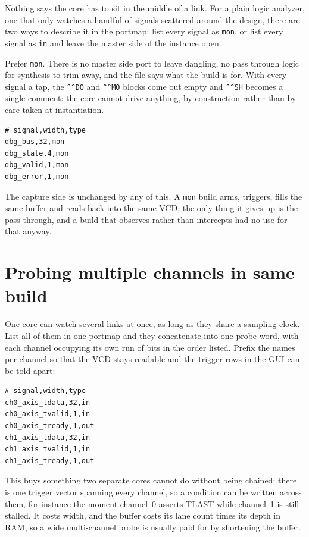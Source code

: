\documentclass[../manual.tex]{subfiles}
\begin{document}
Nothing says the core has to sit in the middle of a link. For a plain logic analyzer, one that only watches a handful of signals scattered around the design, there are two ways to describe it in the portmap: list every signal as \texttt{mon}, or list every signal as \texttt{in} and leave the master side of the instance open.

Prefer \texttt{mon}. There is no master side port to leave dangling, no pass through logic for synthesis to trim away, and the file says what the build is for. With every signal a tap, the \texttt{\^{}\^{}DO} and \texttt{\^{}\^{}MO} blocks come out empty and \texttt{\^{}\^{}SH} becomes a single comment: the core cannot drive anything, by construction rather than by care taken at instantiation.

\begin{lstlisting}
# signal,width,type
dbg_bus,32,mon
dbg_state,4,mon
dbg_valid,1,mon
dbg_error,1,mon
\end{lstlisting}

The capture side is unchanged by any of this. A \texttt{mon} build arms, triggers, fills the same buffer and reads back into the same VCD; the only thing it gives up is the pass through, and a build that observes rather than intercepts had no use for that anyway.

\section{Probing multiple channels in same build}
\label{sec:codegen_multi}

One core can watch several links at once, as long as they share a sampling clock. List all of them in one portmap and they concatenate into one probe word, with each channel occupying its own run of bits in the order listed. Prefix the names per channel so that the VCD stays readable and the trigger rows in the GUI can be told apart:

\begin{lstlisting}
# signal,width,type
ch0_axis_tdata,32,in
ch0_axis_tvalid,1,in
ch0_axis_tready,1,out
ch1_axis_tdata,32,in
ch1_axis_tvalid,1,in
ch1_axis_tready,1,out
\end{lstlisting}

This buys something two separate cores cannot do without being chained: there is one trigger vector spanning every channel, so a condition can be written across them, for instance the moment channel~0 asserts TLAST while channel~1 is still stalled. It costs width, and the buffer costs its lane count times its depth in RAM, so a wide multi-channel probe is usually paid for by shortening the buffer.
\end{document}
